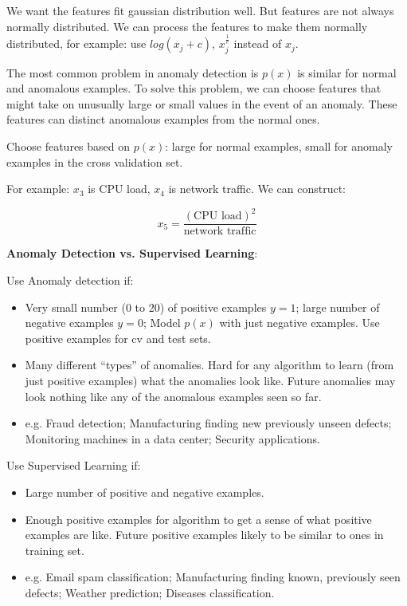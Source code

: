\documentclass{article}
\begin{document}
\noindent We want the features fit gaussian distribution well. But features are not always normally distributed. We can process the features to make them normally distributed, for example: use \(log(x_{j} + c)\), \(x_{j}^{\frac{1}{c}}\) instead of \(x_{j}\).

\bigskip

\noindent The most common problem in anomaly detection is \(p(x)\) is similar for normal and anomalous examples. To solve this problem, we can choose features that might take on unusually large or small values in the event of an anomaly. These features can distinct anomalous examples from the normal ones.

\bigskip

\noindent Choose features based on \(p(x)\): large for normal examples, small for anomaly examples in the cross validation set.

\bigskip

\noindent For example: \(x_3\) is CPU load, \(x_4\) is network traffic. We can construct:

\[x_5 = \frac{(\text{CPU load})^2}{\text{network traffic}}\]

\bigskip

\noindent \textbf{Anomaly Detection vs. Supervised Learning}:

\noindent Use Anomaly detection if:

\begin{itemize}
    \item Very small number (0 to 20) of positive examples \(y = 1\); large number of negative examples \(y = 0\); Model \(p(x)\) with just negative examples. Use positive examples for cv and test sets.
    \item Many different “types” of anomalies. Hard for any algorithm to learn (from just positive examples) what the anomalies look like. Future anomalies may look nothing like any of the anomalous examples seen so far.
    \item e.g. Fraud detection; Manufacturing finding new previously unseen defects; Monitoring machines in a data center; Security applications.
\end{itemize}

\noindent Use Supervised Learning if:

\begin{itemize}
    \item Large number of positive and negative examples.
    \item Enough positive examples for algorithm to get a sense of what positive examples are like. Future positive examples likely to be similar to ones in training set.
    \item e.g. Email spam classification; Manufacturing finding known, previously seen defects; Weather prediction; Diseases classification.
\end{itemize}
\end{document}
